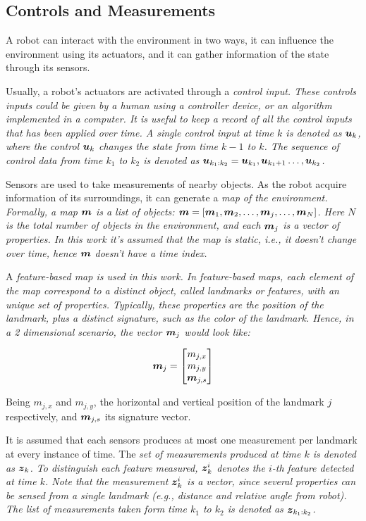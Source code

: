 \subsection{Controls and Measurements}

A robot can interact with the environment in two ways, it can influence the environment using its actuators, and it can gather information of the state through its sensors. 

Usually, a robot's actuators are activated through a \it{control input}. These controls inputs could be given by a human using a controller device, or an algorithm implemented in a computer. It is useful to keep a record of all the control inputs that has been applied over time. A single control input at time $k$ is denoted as $\boldsymbol{u}_k$, where the control $\boldsymbol{u}_k$ changes the state from  time $k-1$ to $k$. The sequence of control data from time $k_1$ to $k_2$ is denoted as $\boldsymbol{u}_{k_1:k_2}= \boldsymbol{u}_{k_1},\boldsymbol{u}_{k_1+1}\dots,\boldsymbol{u}_{k_2}$.

Sensors are used to take measurements of nearby objects. As the robot acquire information of its surroundings, it can generate a \it{map} of the environment. Formally, a map $\boldsymbol{m}$ is a list of objects: $\boldsymbol{m}=[\boldsymbol{m}_1,\boldsymbol{m}_2,\dots,\boldsymbol{m}_j,\dots,\boldsymbol{m}_N]$. Here $N$ is the total number of objects in the environment, and each $\boldsymbol{m}_j$ is a vector of properties. In this work it's assumed that the map is static, i.e., it doesn't change over time, hence $\boldsymbol{m}$ doesn't have a time index.

A \it{feature-based} map is used in this work. In feature-based maps, each element of the map correspond to a distinct object, called \it{landmarks} or \it{features}, with an unique set of properties. Typically, these properties are the position of the landmark, plus a distinct signature, such as the color of the landmark. Hence, in a 2 dimensional scenario, the vector $\boldsymbol{m}_j$ would look like:

\begin{equation}
\boldsymbol{m}_j = \begin{bmatrix}
m_{j,x}\\
m_{j,y}\\
\boldsymbol{m}_{j,s}
\end{bmatrix}
\end{equation} 

Being $m_{j,x}$ and $m_{j,y}$, the horizontal and vertical position of the landmark $j$ respectively, and $\boldsymbol{m}_{j,s}$ its signature vector.

It is assumed that each sensors produces at most one measurement per landmark at every instance of time. The \it{set of measurements} produced at time $k$ is denoted as $\boldsymbol{z}_k$. To distinguish each feature measured, $\boldsymbol{z}_k^i$ denotes the $i$-th feature detected at time $k$. Note that the measurement $\boldsymbol{z}_k^i$ is a vector, since several properties can be sensed from a single landmark (e.g., distance and relative angle from robot). The list of measurements taken form time $k_1$ to $k_2$ is denoted as $\boldsymbol{z}_{k_1:k_2}$.

